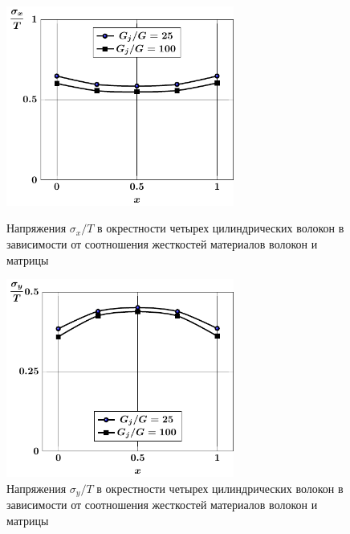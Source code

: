 \begin{figure}[h!]
\centering\footnotesize
\parbox[b]{7.5cm}{\centering\includegraphics[width=7.5cm]{inclusion-4-x-g.pdf}
\caption{Напряжения $\sigma_x/T$ в окрестности четырех цилиндрических волокон в зависимости от соотношения жесткостей материалов волокон и матрицы
\label{f:7:58}}}\hfil\hfil
\parbox[b]{7.5cm}{\centering\includegraphics[width=7.5cm]{inclusion-4-y-g.pdf}
\caption{Напряжения $\sigma_y/T$ в окрестности четырех цилиндрических волокон в зависимости от соотношения жесткостей материалов волокон и матрицы
\label{f:7:59}}}
\end{figure}

%

